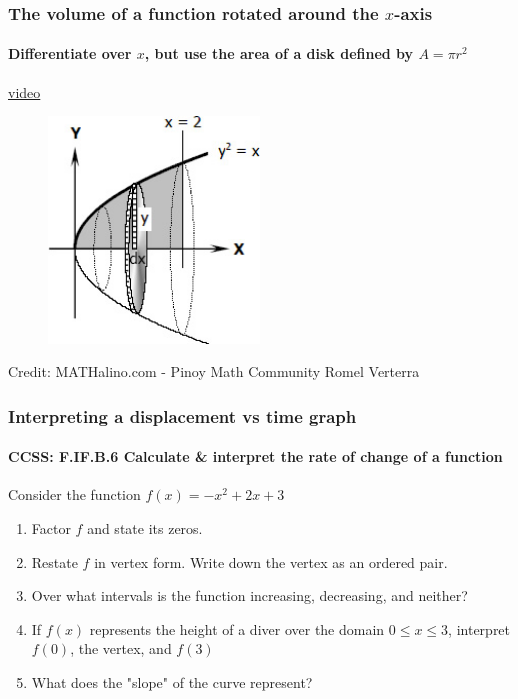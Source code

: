 \documentclass{beamer}
\begin{document}
  \frame
  {
    \frametitle{The volume of a function rotated around the $x$-axis}
    \framesubtitle{Differentiate over $x$, but use the area of a disk defined by $A=\pi r^2$}
  \href{https://www.youtube.com/watch?v=i4L5XoUBD_Q}{video}\\
  \begin{figure}[!ht]
      \centering
      \includegraphics[width=0.5\textwidth]{0413CW-paraboloid.jpg}
  \end{figure}
  \small{Credit: MATHalino.com - Pinoy Math Community Romel Verterra}
  }

  \frame
  {
    \frametitle{Interpreting a displacement vs time graph}
    \framesubtitle{CCSS: F.IF.B.6 Calculate \& interpret the rate of change of a function}

    \begin{block}{Consider the function $f(x)=-x^2+2x+3$}
    \begin{enumerate}
        \item Factor $f$ and state its zeros.
        \item Restate $f$ in vertex form. Write down the vertex as an ordered pair.
        \item Over what intervals is the function increasing, decreasing, and neither?
        \item If $f(x)$ represents the height of a diver over the domain $0 \leq x \leq 3$, interpret $f(0)$, the vertex, and $f(3)$
        \item What does the "slope" of the curve represent?
    \end{enumerate}
    \end{block}
  }
\end{document}
